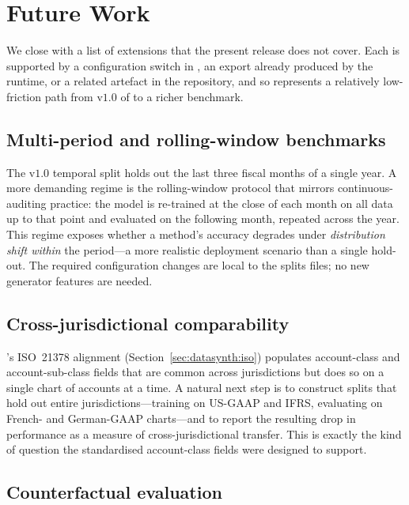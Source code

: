 \section{Future Work}
\label{sec:future-work}

We close with a list of extensions that the present release does
not cover.  Each is supported by a configuration switch in
\system{}, an export already produced by the runtime, or a related
artefact in the repository, and so represents a relatively
low-friction path from v$1.0$ of \bench{} to a richer benchmark.

\subsection{Multi-period and rolling-window benchmarks}
\label{sec:future-work:rolling}

The v$1.0$ temporal split holds out the last three fiscal months
of a single year.  A more demanding regime is the rolling-window
protocol that mirrors continuous-auditing practice: the model is
re-trained at the close of each month on all data up to that
point and evaluated on the following month, repeated across the
year.  This regime exposes whether a method's accuracy degrades
under \emph{distribution shift within} the period---a more
realistic deployment scenario than a single hold-out.  The
required configuration changes are local to the splits files; no
new generator features are needed.

\subsection{Cross-jurisdictional comparability}
\label{sec:future-work:jurisdiction}

\system{}'s ISO~21378 alignment (Section~\ref{sec:datasynth:iso})
populates account-class and account-sub-class fields that are
common across jurisdictions but does so on a single chart of
accounts at a time.  A natural next step is to construct splits
that hold out entire jurisdictions---training on US-GAAP and
IFRS, evaluating on French- and German-GAAP charts---and to
report the resulting drop in performance as a measure of
cross-jurisdictional transfer.  This is exactly the kind of
question the standardised account-class fields were designed to
support.

\subsection{Counterfactual evaluation}
\label{sec:future-work:counterfactual}

